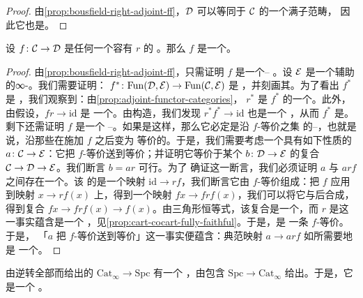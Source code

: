 \begin{proof}
由\cref{prop:bousfield-right-adjoint-ff}，$\mathcal{D}$ 可以等同于 $\mathcal{C}$ 的一个满子范畴，
因此它也是\trLocallySmall{}。
\end{proof}

\begin{proposition}\label{prop:ff-right-adjoint-bousfield}
设 $f\colon \mathcal{C} \to \mathcal{D}$ 是任何一个容有\trFullyFaithful{}\trRightAdjoint{} $r$
的%
\trFunctor{}。那么 $f$ 是一个\trBousfield{}\trLocalization{}。
\end{proposition}

\begin{proof}
由\cref{prop:bousfield-right-adjoint-ff}，只需证明 $f$ 是一个\trDwyer{}--%
\trKan{}\trLocalization{}。设 $\mathcal{E}$ 是一个辅助的∞-\trCategory{}。我们需要证明：
\trFunctor{} $f^*\colon \mathrm{Fun}(\mathcal{D}, \mathcal{E}) \to \mathrm{Fun}(\mathcal{C}, \mathcal{E})$ 是%
\trFullyFaithful{}，并刻画其\trEssentialImage{}。为了看出 $f^*$ 是%
\trFullyFaithful{}，我们观察到：由\cref{prop:adjoint-functor-categories}，
$r^*$ 是 $f^*$ 的一个\trLeftAdjoint{}。此外，由假设，$fr \to \mathrm{id}$ 是
一个\trEquivalence{}。由构造，我们发现 $r^*f^* \to \mathrm{id}$ 也是一个%
\trEquivalence{}，从而 $f^*$ 是\trFullyFaithful{}。剩下还需证明 $f$ 是一个%
\trDwyer{}--\trKan{}\trLocalization{}。如果是这样，那么它必定是沿 $f$-等价之集
的\trDwyer{}--\trKan{}\trLocalization{}，也就是说，沿那些在施加 $f$ 之后变为
等价的\trMorphism{}。于是，我们需要考虑一个具有如下性质的\trFunctor{}%
$a\colon \mathcal{C} \to \mathcal{E}$：它把 $f$-等价送到等价；并证明它等价于某个\trFunctor{}%
$b\colon \mathcal{D} \to \mathcal{E}$ 的复合 $\mathcal{C} \to \mathcal{D} \to \mathcal{E}$。我们断言 $b = ar$ 可行。为了
确证这一断言，我们必须证明 $a$ 与 $arf$ 之间存在一个\trEquivalence{}。该%
\trAdjunction{}的\trUnit{}是一个映射 $\mathrm{id} \to rf$，我们断言它由
$f$-等价组成：把 $f$ 应用到映射 $x \to rf(x)$ 上，得到一个映射
$fx \to frf(x)$，我们可以将它与\trCounit{}后合成，得到复合
$fx \to frf(x) \to f(x)$。由三角形恒等式，该复合是一个\trEquivalence{}，而%
\trRightAdjoint{} $r$ 是\trFullyFaithful{}这一事实蕴含\trCounit{}是一个%
\trEquivalence{}，见\cref{prop:cart-cocart-fully-faithful}。于是，\trUnit{}是
一条 $f$-等价。于是，
「$a$ 把 $f$-等价送到等价」这一事实便蕴含：典范映射 $a \to arf$ 如所需要地是
一个\trEquivalence{}。
\end{proof}

\begin{example*}
由逆转全部\trMorphism{}而给出的\trFunctor{}%
$\mathrm{Cat}_{\infty} \to \mathrm{Spc}$ 有一个\trFullyFaithful{}%
\trRightAdjoint{}，由包含
$\mathrm{Spc} \to \mathrm{Cat}_{\infty}$ 给出。于是，它是一个%
\trBousfield{}\trLocalization{}。
\end{example*}


